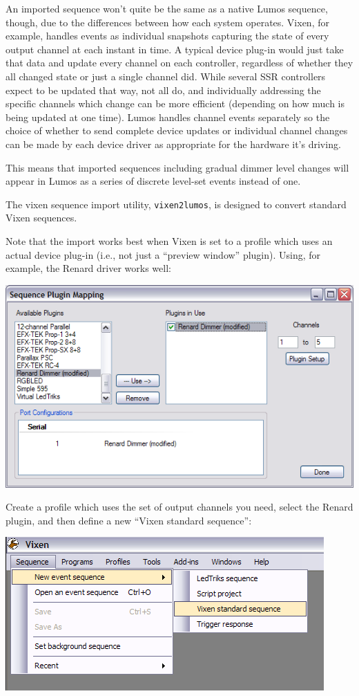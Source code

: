 \documentclass{article}
\begin{document}
An imported sequence won't quite be the same as a native Lumos sequence,
though, due to the differences between how each system operates.  
Vixen, for example, handles events as individual snapshots capturing the state of every output channel at each instant in time. A typical device plug-in would just take that data and update every channel on each controller, regardless of whether they all changed state or just a single channel did. While several SSR controllers expect to be updated that way, not all do, and individually addressing the specific channels which change can be more efficient (depending on how much is being updated at one time). Lumos handles channel events separately so the choice of whether to send complete device updates or individual channel changes can be made by each device driver as appropriate for the hardware it's driving.

This means that imported sequences including gradual dimmer level changes will
appear in Lumos as a series of discrete level-set events instead of one.  

The vixen sequence import utility, {\tt vixen2lumos}, is designed to convert
standard Vixen sequences.  

Note that the import works best when Vixen is set to a profile which uses an
actual device plug-in (i.e., not just a ``preview window'' plugin).  Using,
for example, the Renard driver works well:

\noindent\includegraphics{vix-plugin}

Create a profile which uses the set of output channels you need, select the
Renard plugin, and then define a new ``Vixen standard sequence'':

\noindent\includegraphics{vix-menu}
\end{document}
